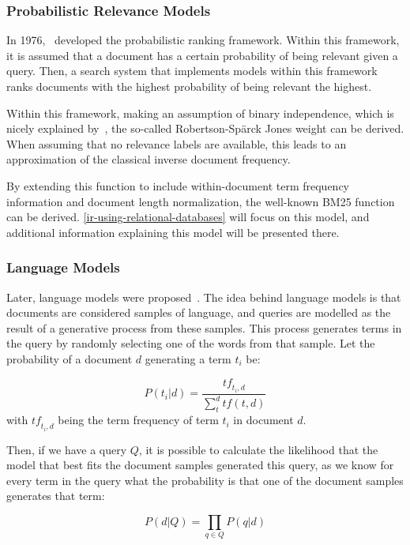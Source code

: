 \subsubsection{Probabilistic Relevance Models}
In 1976,~\citeauthor{RSJ} developed the probabilistic ranking framework. Within this framework, it is assumed that a document has a certain probability of being relevant given a query. Then, a search system that implements models within this framework ranks documents with the highest probability of being relevant the highest.

Within this framework, making an assumption of binary independence, which is nicely explained by~\citet{bm25-beyond}, the so-called Robertson-Sp{\"a}rck Jones weight can be derived. When assuming that no relevance labels are available, this leads to an approximation of the classical inverse document frequency.

By extending this function to include within-document term frequency information and document length normalization, the well-known BM25 function can be derived. \cref{ir-using-relational-databases} will focus on this model, and additional information explaining this model will be presented there.

\subsubsection{Language Models}
Later, language models were proposed~\citep{croft_lm, hiemstra_lm, zhai_lm}. The idea behind language models is that documents are considered samples of language, and queries are modelled as the result of a generative process from these samples. This process generates terms in the query by randomly selecting one of the words from that sample. Let the probability of a document $d$ generating a term $t_i$ be:

\begin{equation}
	P(t_i|d) = \frac{\mathit{tf}_{t_i,d}}{\sum_t^d tf(t, d)}
\end{equation}
with $\mathit{tf}_{t_i, d}$ being the term frequency of term $t_i$ in document $d$. 

Then, if we have a query $Q$, it is possible to calculate the likelihood that the model that best fits the document samples generated this query, as we know for every term in the query what the probability is that one of the document samples generates that term: 

\begin{equation}
	P(d|Q) = \prod_{q \in Q} P(q | d)
\end{equation}

